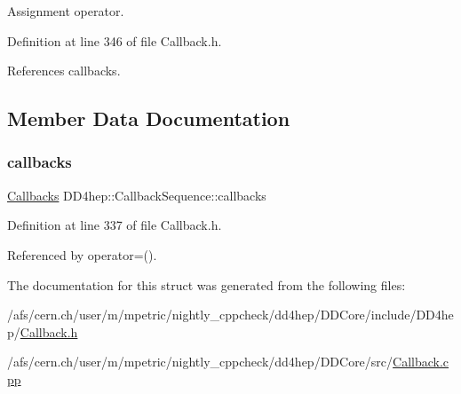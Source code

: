 Assignment operator. 



Definition at line 346 of file Callback.\+h.



References callbacks.



\subsection{Member Data Documentation}
\hypertarget{struct_d_d4hep_1_1_callback_sequence_a76c6c81bd2cd430ca45bde9206fb1839}{}\label{struct_d_d4hep_1_1_callback_sequence_a76c6c81bd2cd430ca45bde9206fb1839} 
\subsubsection{\texorpdfstring{callbacks}{callbacks}}
{\footnotesize\ttfamily \hyperlink{struct_d_d4hep_1_1_callback_sequence_a2d9d9488b193731498c4b9cc0fdc4a6b}{Callbacks} D\+D4hep\+::\+Callback\+Sequence\+::callbacks}



Definition at line 337 of file Callback.\+h.



Referenced by operator=().



The documentation for this struct was generated from the following files\+:\begin{DoxyCompactItemize}
\item 
/afs/cern.\+ch/user/m/mpetric/nightly\+\_\+cppcheck/dd4hep/\+D\+D\+Core/include/\+D\+D4hep/\hyperlink{_callback_8h}{Callback.\+h}\item 
/afs/cern.\+ch/user/m/mpetric/nightly\+\_\+cppcheck/dd4hep/\+D\+D\+Core/src/\hyperlink{_callback_8cpp}{Callback.\+cpp}\end{DoxyCompactItemize}
